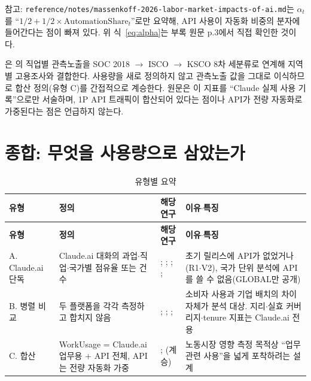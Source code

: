 \documentclass[11pt]{article}
\begin{document}
참고: \texttt{reference/notes/massenkoff-2026-labor-market-impacts-of-ai.md}는 $\alpha_t$를 ``$1/2 + 1/2\times\text{AutomationShare}_t$''로만 요약해, API 사용이 자동화 비중의 분자에 들어간다는 점이 빠져 있다. 위 식~\eqref{eq:alpha}는 부록 원문 p.3에서 직접 확인한 것이다.

\textbf{\textcite{kim-2026-generative-ai-korean-labor-market}}은 \textcite{massenkoff-2026-labor-market-impacts-of-ai}의 직업별 관측노출을 SOC 2018 $\to$ ISCO $\to$ KSCO 8차 세분류로 연계해 지역별 고용조사와 결합한다. 사용량을 새로 정의하지 않고 관측노출 값을 그대로 이식하므로 합산 정의(유형 C)를 간접적으로 계승한다. 원문은 이 지표를 ``Claude 실제 사용 기록''으로만 서술하며, 1P API 트래픽이 합산되어 있다는 점이나 API가 전량 자동화로 가중된다는 점은 언급하지 않는다.

\section{종합: 무엇을 사용량으로 삼았는가}

\begin{longtable}{L{2.4cm}L{4.4cm}L{4.6cm}L{4.4cm}}
\caption{유형별 요약}\label{tab:summary}\\
\toprule
\textbf{유형} & \textbf{정의} & \textbf{해당 연구} & \textbf{이유$\cdot$특징}\\
\midrule
\endfirsthead
\toprule
\textbf{유형} & \textbf{정의} & \textbf{해당 연구} & \textbf{이유$\cdot$특징}\\
\midrule
\endhead
\bottomrule
\endfoot
A. Claude.ai 단독 & Claude.ai 대화의 과업$\cdot$직업$\cdot$국가별 점유율 또는 건수 & \textcite{handa-2025-which-economic-tasks-are}; \textcite{tamkin-2025-estimating-ai-productivity-gains-from}; \textcite{fan-2026-what-countries-use-ai-and}; \textcite{fan-2026-aggregate-gains-from-ai}; \textcite{bick-2026-what-work-does-generative} & 초기 릴리스에 API가 없었거나(R1$\cdot$V2), 국가 단위 분석에 API를 쓸 수 없음(GLOBAL만 공개)\\
B. 병렬 비교 & 두 플랫폼을 각각 측정하고 합치지 않음 & \textcite{appel-2025-uneven-geographic-and-enterprise-ai}; \textcite{appel-2026-economic-primitives}; \textcite{massenkoff-2026-learning-curves}; \textcite{massenkoff-2026-cadences} & 소비자 사용과 기업 배치의 차이 자체가 분석 대상. 지리$\cdot$실효 커버리지$\cdot$tenure 지표는 Claude.ai 전용\\
C. 합산 & WorkUsage = Claude.ai 업무용 + API 전체, API는 전량 자동화 가중 & \textcite{massenkoff-2026-labor-market-impacts-of-ai}; (계승) \textcite{kim-2026-generative-ai-korean-labor-market} & 노동시장 영향 측정 목적상 ``업무 관련 사용''을 넓게 포착하려는 설계\\
\end{longtable}
\end{document}
